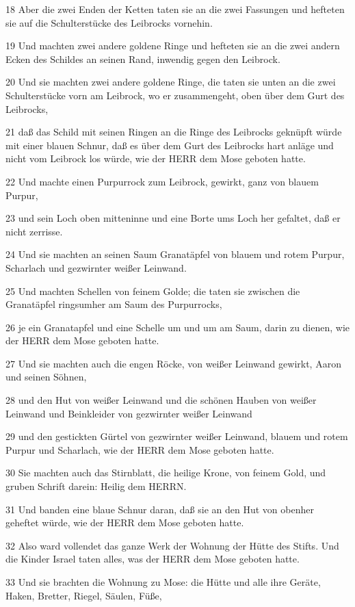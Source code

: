 \par 18 Aber die zwei Enden der Ketten taten sie an die zwei Fassungen und hefteten sie auf die Schulterstücke des Leibrocks vornehin.
\par 19 Und machten zwei andere goldene Ringe und hefteten sie an die zwei andern Ecken des Schildes an seinen Rand, inwendig gegen den Leibrock.
\par 20 Und sie machten zwei andere goldene Ringe, die taten sie unten an die zwei Schulterstücke vorn am Leibrock, wo er zusammengeht, oben über dem Gurt des Leibrocks,
\par 21 daß das Schild mit seinen Ringen an die Ringe des Leibrocks geknüpft würde mit einer blauen Schnur, daß es über dem Gurt des Leibrocks hart anläge und nicht vom Leibrock los würde, wie der HERR dem Mose geboten hatte.
\par 22 Und machte einen Purpurrock zum Leibrock, gewirkt, ganz von blauem Purpur,
\par 23 und sein Loch oben mitteninne und eine Borte ums Loch her gefaltet, daß er nicht zerrisse.
\par 24 Und sie machten an seinen Saum Granatäpfel von blauem und rotem Purpur, Scharlach und gezwirnter weißer Leinwand.
\par 25 Und machten Schellen von feinem Golde; die taten sie zwischen die Granatäpfel ringsumher am Saum des Purpurrocks,
\par 26 je ein Granatapfel und eine Schelle um und um am Saum, darin zu dienen, wie der HERR dem Mose geboten hatte.
\par 27 Und sie machten auch die engen Röcke, von weißer Leinwand gewirkt, Aaron und seinen Söhnen,
\par 28 und den Hut von weißer Leinwand und die schönen Hauben von weißer Leinwand und Beinkleider von gezwirnter weißer Leinwand
\par 29 und den gestickten Gürtel von gezwirnter weißer Leinwand, blauem und rotem Purpur und Scharlach, wie der HERR dem Mose geboten hatte.
\par 30 Sie machten auch das Stirnblatt, die heilige Krone, von feinem Gold, und gruben Schrift darein: Heilig dem HERRN.
\par 31 Und banden eine blaue Schnur daran, daß sie an den Hut von obenher geheftet würde, wie der HERR dem Mose geboten hatte.
\par 32 Also ward vollendet das ganze Werk der Wohnung der Hütte des Stifts. Und die Kinder Israel taten alles, was der HERR dem Mose geboten hatte.
\par 33 Und sie brachten die Wohnung zu Mose: die Hütte und alle ihre Geräte, Haken, Bretter, Riegel, Säulen, Füße,
